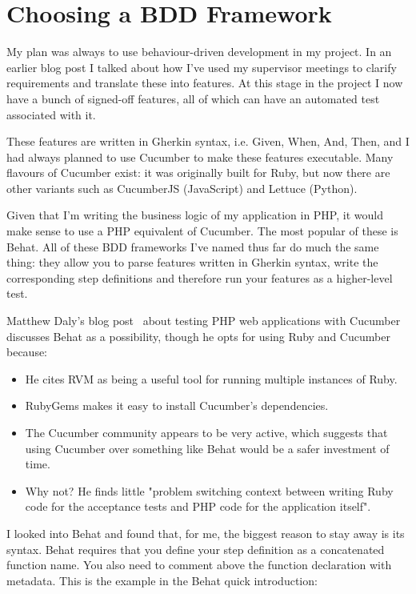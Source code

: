 \chapter{Choosing a BDD Framework} \label{appendix:bdd}

My plan was always to use behaviour-driven development in my project. In an earlier blog post I talked about how I've used my supervisor meetings to clarify requirements and translate these into features. At this stage in the project I now have a bunch of signed-off features, all of which can have an automated test associated with it.

These features are written in Gherkin syntax, i.e. Given, When, And, Then, and I had always planned to use Cucumber to make these features executable. Many flavours of Cucumber exist: it was originally built for Ruby, but now there are other variants such as CucumberJS (JavaScript) and Lettuce (Python).

Given that I'm writing the business logic of my application in PHP, it would make sense to use a PHP equivalent of Cucumber. The most popular of these is Behat. All of these BDD frameworks I've named thus far do much the same thing: they allow you to parse features written in Gherkin syntax, write the corresponding step definitions and therefore run your features as a higher-level test.

Matthew Daly's blog post~\cite{matthewDaly} about testing PHP web applications with Cucumber discusses Behat as a possibility, though he opts for using Ruby and Cucumber because:

\begin{itemize}
    \item He cites RVM as being a useful tool for running multiple instances of Ruby.

    \item RubyGems makes it easy to install Cucumber's dependencies.

    \item The Cucumber community appears to be very active, which suggests that using Cucumber over something like Behat would be a safer investment of time.

    \item Why not? He finds little "problem switching context between writing Ruby code for the acceptance tests and PHP code for the application itself".
\end{itemize}

I looked into Behat and found that, for me, the biggest reason to stay away is its syntax. Behat requires that you define your step definition as a concatenated function name. You also need to comment above the function declaration with metadata. This is the example in the Behat quick introduction:

